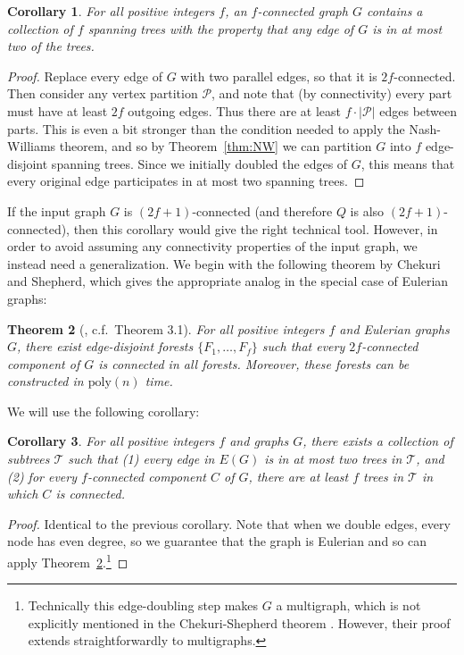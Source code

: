 \documentclass{article}
\theoremstyle{plain}
\newtheorem{theorem}{Theorem}
\newtheorem{corollary}[theorem]{Corollary}
\theoremstyle{definition}
\newcommand{\tee}{\mathcal{T}}
\begin{document}
\begin{corollary} \label{cor:nwdecomp}
For all positive integers $f$, an $f$-connected graph $G$ contains a collection of $f$ spanning trees with the property that any edge of $G$ is in at most two of the trees.
\end{corollary}
\begin{proof}
Replace every edge of $G$ with two parallel edges, so that it is $2f$-connected.
Then consider any vertex partition $\mathcal{P}$, and note that (by connectivity) every part must have at least $2f$ outgoing edges.
Thus there are at least $f \cdot |\mathcal{P}|$ edges between parts.  
This is even a bit stronger than the condition needed to apply the Nash-Williams theorem, and so by Theorem~\ref{thm:NW} we can partition $G$ into $f$ edge-disjoint spanning trees.  Since we initially doubled the edges of $G$, this means that every original edge participates in at most two spanning trees.
\end{proof}

If the input graph $G$ is $(2f+1)$-connected (and therefore $Q$ is also $(2f+1)$-connected), then this corollary would give the right technical tool.
However, in order to avoid assuming any connectivity properties of the input graph, we instead need a generalization.
We begin with the following theorem by Chekuri and Shepherd, which gives the appropriate analog in the special case of Eulerian graphs:
\begin{theorem} [\cite{chekuri2009approximate}, c.f.\ Theorem 3.1]\label{lem:pairwisenw}
For all positive integers $f$ and Eulerian graphs $G$, there exist edge-disjoint forests $\{F_1, \dots, F_f\}$ such that every $2f$-connected component of $G$ is connected in all forests.
Moreover, these forests can be constructed in $\text{poly}(n)$ time.
\end{theorem}

We will use the following corollary:
\begin{corollary} \label{cor:pairwisenw}
For all positive integers $f$ and graphs $G$, there exists a collection of subtrees $\tee$ such that (1) every edge in $E(G)$ is in at most two trees in $\tee$, and (2) for every $f$-connected component $C$ of $G$, there are at least $f$ trees in $\tee$ in which $C$ is connected.  
\end{corollary}
\begin{proof}
Identical to the previous corollary.
Note that when we double edges, every node has even degree, so we guarantee that the graph is Eulerian and so can apply Theorem~\ref{lem:pairwisenw}.\footnote{Technically this edge-doubling step makes $G$ a multigraph, which is not explicitly mentioned in the Chekuri-Shepherd theorem \cite{chekuri2009approximate}.  However, their proof extends straightforwardly to multigraphs.}
\end{proof}
\end{document}
